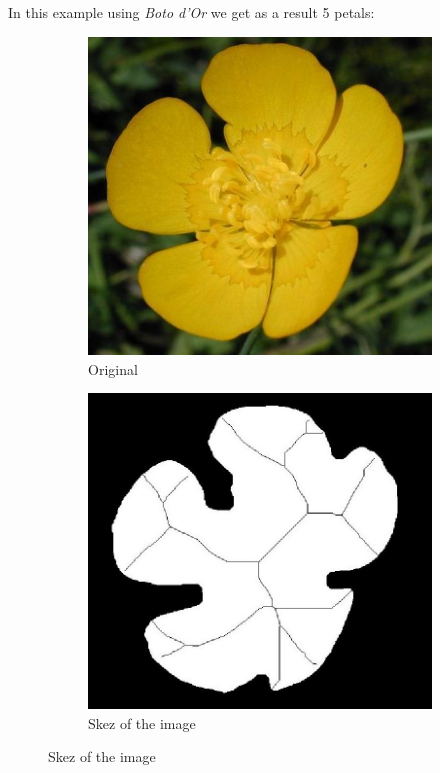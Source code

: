\documentclass[11]{article}
\begin{document}
\noindent In this example using \textit{Boto d'Or} we get as a result 5 petals:
\begin{figure}[H]
    \begin{subfigure}[t]{.49\linewidth}
    \centering
  \includegraphics[scale=0.25]{images/numberOfPetalsOriginal.jpg}
  \caption{Original}
  \label{original}
    \end{subfigure}
    \begin{subfigure}[t]{.49\linewidth}
    \centering
    \includegraphics[scale=0.2]{images/numberOfPetals.jpg}
    \caption{Skez of the image}
    \label{skez}
    \end{subfigure}
\end{figure}
\end{document}
